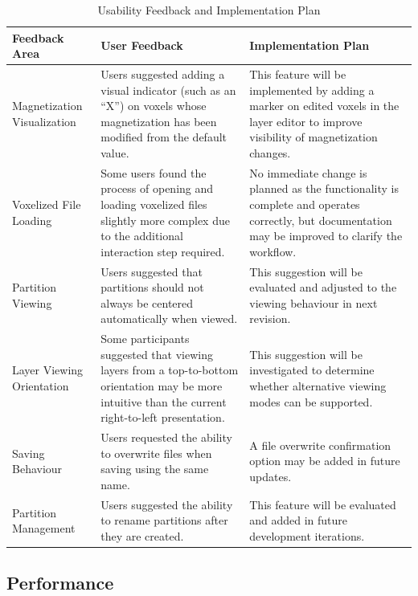 \documentclass[12pt, titlepage]{article}
\begin{document}
\begin{table}[H]
\centering
\caption{Usability Feedback and Implementation Plan}
\label{tab:usability-feedback}
\begin{tabular}{|p{4cm}|p{6cm}|p{6cm}|}
\hline
\textbf{Feedback Area} & \textbf{User Feedback} & \textbf{Implementation Plan} \\ \hline

Magnetization Visualization & Users suggested adding a visual indicator (such as an ``X'') on voxels whose magnetization has been modified from the default value. & This feature will be implemented by adding a marker on edited voxels in the layer editor to improve visibility of magnetization changes. \\ \hline

Voxelized File Loading & Some users found the process of opening and loading voxelized files slightly more complex due to the additional interaction step required. & No immediate change is planned as the functionality is complete and operates correctly, but documentation may be improved to clarify the workflow. \\ \hline

Partition Viewing & Users suggested that partitions should not always be centered automatically when viewed. & This suggestion will be evaluated and adjusted to the viewing behaviour in next revision. \\ \hline

Layer Viewing Orientation & Some participants suggested that viewing layers from a top-to-bottom orientation may be more intuitive than the current right-to-left presentation. & This suggestion will be investigated to determine whether alternative viewing modes can be supported. \\ \hline

Saving Behaviour & Users requested the ability to overwrite files when saving using the same name. & A file overwrite confirmation option may be added in future updates. \\ \hline

Partition Management & Users suggested the ability to rename partitions after they are created. & This feature will be evaluated and added in future development iterations. \\ \hline

\end{tabular}
\end{table}
\subsection{Performance}
\end{document}
